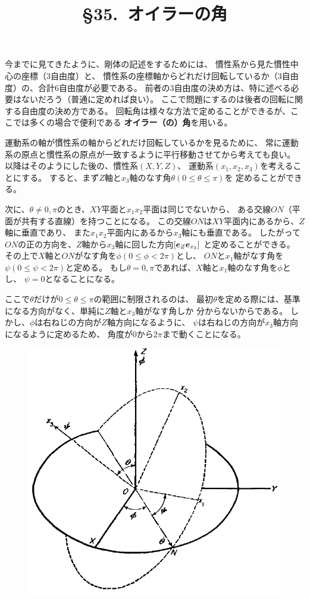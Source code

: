 \documentclass[a4paper]{jsarticle}
\title{\S 35.\ オイラーの角}
\def\vec#1{\mbox{\boldmath $#1$}}
\begin{document}
\maketitle

今までに見てきたように、剛体の記述をするためには、
慣性系から見た慣性中心の座標（3自由度）と、
慣性系の座標軸からどれだけ回転しているか（3自由度）の、合計6自由度が必要である。
前者の3自由度の決め方は、特に述べる必要はないだろう（普通に定めれば良い）。
ここで問題にするのは後者の回転に関する自由度の決め方である。
回転角は様々な方法で定めることができるが、ここでは多くの場合で便利である
\textbf{オイラー（の）角}を用いる。

運動系の軸が慣性系の軸からどれだけ回転しているかを見るために、
常に運動系の原点と慣性系の原点が一致するように平行移動させてから考えても良い。
以降はそのようにした後の、慣性系$(X, Y, Z)$、
運動系$(x_1, x_2, x_3)$を考えることにする。
すると、まず$Z$軸と$x_3$軸のなす角$\theta (0 \le \theta \le \pi)$を
定めることができる。

次に、$\theta \ne 0, \pi$のとき、$XY$平面と$x_1 x_2$平面は同じでないから、
ある交線$ON$（平面が共有する直線）を持つことになる。
この交線$ON$は$XY$平面内にあるから、$Z$軸に垂直であり、
また$x_1x_2$平面内にあるから$x_3$軸にも垂直である。
したがって$ON$の正の方向を、$Z$軸から$x_3$軸に回した方向$[\vec{e}_{Z} \vec{e}_{x_3}]$
と定めることができる。
その上で$X$軸と$ON$がなす角を$\phi (0 \le \phi < 2\pi)$とし、
$ON$と$x_1$軸がなす角を$\psi (0 \le \psi < 2\pi)$と定める。
もし$\theta = 0, \pi$であれば、$X$軸と$x_1$軸のなす角を$\phi$とし、
$\psi=0$となることになる。

ここで$\theta$だけが$0 \le \theta \le \pi$の範囲に制限されるのは、
最初$\theta$を定める際には、基準になる方向がなく、単純に$Z$軸と$x_3$軸がなす角しか
分からないからである。
しかし、$\phi$は右ねじの方向が$Z$軸方向になるように、
$\psi$は右ねじの方向が$x_3$軸方向になるように定めるため、
角度が$0$から$2\pi$まで動くことになる。

\setcounter{figure}{46}
\begin{figure}[h]
	\begin{center}
		\includegraphics[width=0.5\linewidth]{fig/47.png}
	\end{center}
	\caption{}
	\label{fig:angle}
\end{figure}
\end{document}

